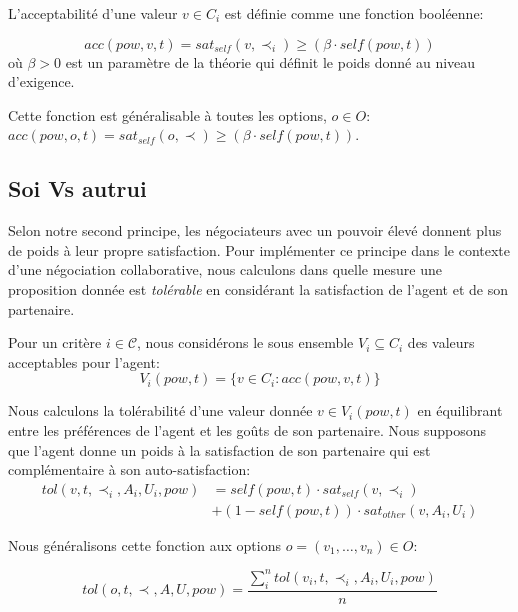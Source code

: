 		L'acceptabilité d'une valeur $ v \in C_i $ est définie comme une fonction booléenne:	
		
		\begin{equation}
		acc(pow,v, t) = sat_{self}(v, \prec_i) \geq  (\beta \cdot self(pow,t))
		\end{equation}	
		où $ \beta> 0 $ est un paramètre de la théorie qui définit le poids donné au niveau d'exigence.
		
		Cette fonction est généralisable à toutes les options,  $o \in O$: $acc(pow,o, t) = sat_{self}(o, \prec) \geq  (\beta \cdot self(pow,t))$.
		
		\subsection{Soi Vs autrui}
	
		Selon notre second principe, les négociateurs avec un pouvoir élevé donnent plus de poids à leur propre satisfaction. Pour implémenter ce principe dans le contexte d'une négociation collaborative, nous calculons dans quelle mesure une proposition donnée est \textit{tolérable} en considérant la satisfaction de l'agent et de son partenaire.
		
		Pour un critère $i \in \mathcal{C}$, nous considérons le sous ensemble $V_i\subseteq C_i$ des valeurs acceptables pour l'agent: 
			\begin{equation}
			V_i(pow,t) = \{ v\in C_i : acc(pow,v,t) \}
			\end{equation}
		
		
		Nous calculons la tolérabilité d'une valeur donnée $ v \in V_i (pow, t) $ en équilibrant entre les préférences de l'agent et les goûts de son partenaire. Nous supposons que l'agent donne un poids à la satisfaction de son partenaire qui est complémentaire à son auto-satisfaction:
			\begin{equation}
			\begin{split}
			tol(v, t, \prec_i, A_i, U_i, pow) & = self(pow, t)  \cdot sat_{self}(v, \prec_i) \\
			& +  (1 - self(pow, t)) \cdot sat_{other}(v, A_i, U_i)
			\end{split} 
			\end{equation}
		
		
		Nous généralisons cette fonction aux options $o=(v_1,\ldots,v_n) \in O$:
		
		\begin{equation}
		tol(o, t, \prec, A, U, pow) = \frac{ \sum_{i}^{n} tol(v_i, t, \prec_i, A_i, U_i, pow) } {n}
		\end{equation}
		
